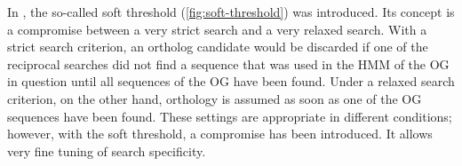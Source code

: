 In \pname, the so-called soft threshold (\autoref{fig:soft-threshold}) was
introduced. Its concept is a compromise between a very strict search and a very
relaxed search. With a strict search criterion, an ortholog candidate would be
discarded if one of the reciprocal searches did not find a sequence that was
used in the HMM of the OG in question until all sequences of the OG have been
found. Under a relaxed search criterion, on the other hand, orthology is assumed
as soon as one of the OG sequences have been found. These settings are
appropriate in different conditions; however, with the soft threshold, a
compromise has been introduced. It allows very fine tuning of search
specificity. 


